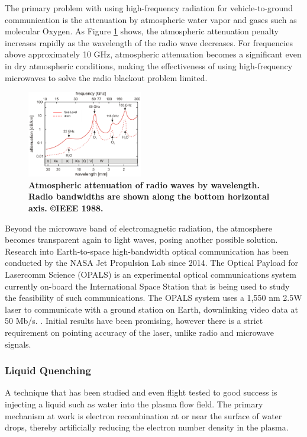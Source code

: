 \documentclass[twocolumn]{article}
\begin{document}
	The primary problem with using high-frequency radiation for vehicle-to-ground communication is the attenuation by atmospheric water vapor and gases such as molecular Oxygen.
	As Figure \ref{fig:RadioAttenuation} shows, the atmospheric attenuation penalty increases rapidly as the wavelength of the radio wave decreases.
	For frequencies above approximately 10 GHz, atmospheric attenuation becomes a significant even in dry atmospheric conditions, making the effectiveness of using high-frequency microwaves to solve the radio blackout problem limited.\cite{hartunian_implications_2007}
	
	\begin{figure}[H]
		\centering
		\includegraphics[width=0.45\textwidth]{Images/intro-atmospheric.png}
	\caption{\textbf{Atmospheric attenuation of radio waves by wavelength. Radio bandwidths are shown along the bottom horizontal axis.\cite{altshuler_comparison_1988} \copyright IEEE 1988.}}
	\label{fig:RadioAttenuation}
	\end{figure}
	
	Beyond the microwave band of electromagnetic radiation, the atmosphere becomes transparent again to light waves, posing another possible solution.
	Research into Earth-to-space high-bandwidth optical communication has been conducted by the NASA Jet Propulsion Lab since 2014.
	The Optical Payload for Lasercomm Science (OPALS) is an experimental optical communications system currently on-board the International Space Station that is being used to study the feasibility of such communications.
	The OPALS system uses a 1,550 nm 2.5W laser to communicate with a ground station on Earth, downlinking video data at 50 Mb/s. \cite{oaida_optical_2014}.
	Initial results have been promising, however there is a strict requirement on pointing accuracy of the laser, unlike radio and microwave signals. \cite{abrahamson_achieving_2015}
	
	\subsubsection*{Liquid Quenching}
	A technique that has been studied and even flight tested to good success is injecting a liquid such as water into the plasma flow field.
	The primary mechanism at work is electron recombination at or near the surface of water drops, thereby artificially reducing the electron number density in the plasma. %
	
\end{document}
